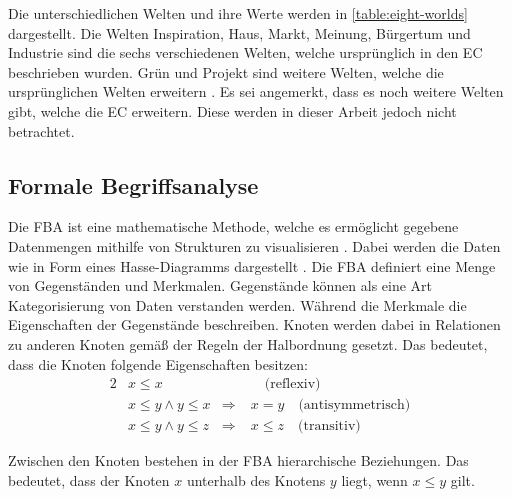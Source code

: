 Die unterschiedlichen Welten und ihre Werte werden in \autoref{table:eight-worlds} dargestellt.
Die Welten Inspiration, Haus, Markt, Meinung, Bürgertum und Industrie sind die sechs verschiedenen Welten, welche ursprünglich in den \ac{EC} beschrieben wurden.
Grün und Projekt sind weitere Welten, welche die ursprünglichen Welten erweitern \cite{ec-green, new-spirit-of-capitalism}.
Es sei angemerkt, dass es noch weitere Welten gibt, welche die \ac{EC} erweitern.
Diese werden in dieser Arbeit jedoch nicht betrachtet.

\subsection{Formale Begriffsanalyse}
Die \ac{FBA} ist eine mathematische Methode, welche es ermöglicht gegebene Datenmengen mithilfe von Strukturen zu visualisieren \cite{formale-begriffsanalyse, formal-concept-analysis-wille}.
Dabei werden die Daten wie in Form eines Hasse-Diagramms dargestellt \cite{introduction-lattices}.
Die \ac{FBA} definiert eine Menge von Gegenständen und Merkmalen.
Gegenstände können als eine Art Kategorisierung von Daten verstanden werden.
Während die Merkmale die Eigenschaften der Gegenstände beschreiben.
Knoten werden dabei in Relationen zu anderen Knoten gemäß der Regeln der Halbordnung gesetzt.
Das bedeutet, dass die Knoten folgende Eigenschaften besitzen:
\begin{alignat*}{2}
     & x\leq x              &                & \quad\text{(reflexiv)}            \\
     & x\leq y\land y\leq x & \Rightarrow \; & x=y \quad\text{(antisymmetrisch)} \\
     & x\leq y\land y\leq z & \Rightarrow \; & x\leq z \quad\text{(transitiv)}
\end{alignat*}

Zwischen den Knoten bestehen in der \ac{FBA} hierarchische Beziehungen.
Das bedeutet, dass der Knoten $x$ unterhalb des Knotens $y$ liegt, wenn $x \leq y$ gilt.

